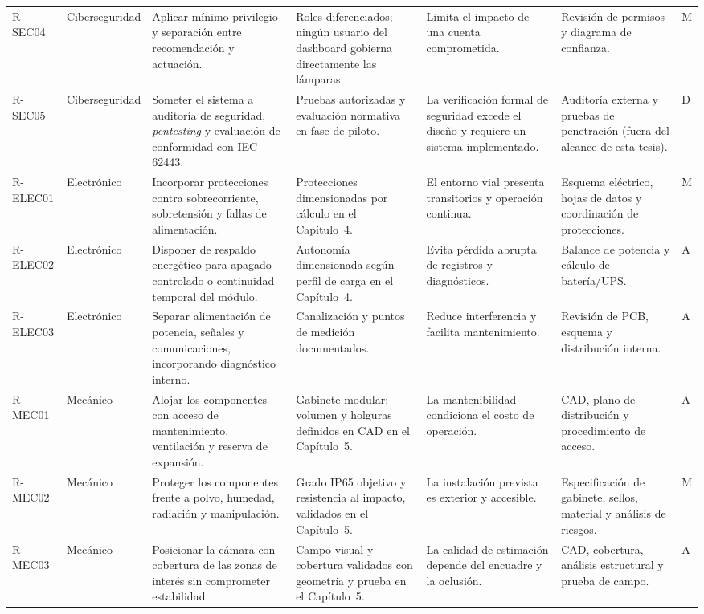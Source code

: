 \begin{landscape}
\begin{longtable}{@{}p{1.15cm}p{1.7cm}p{5.1cm}p{3.1cm}p{4.2cm}p{3.6cm}p{1.0cm}@{}}
R-SEC04 & Ciberseguridad & Aplicar mínimo privilegio y separación entre recomendación y actuación. & Roles diferenciados; ningún usuario del dashboard gobierna directamente las lámparas. & Limita el impacto de una cuenta comprometida. & Revisión de permisos y diagrama de confianza. & M\\
R-SEC05 & Ciberseguridad & Someter el sistema a auditoría de seguridad, \textit{pentesting} y evaluación de conformidad con IEC 62443. & Pruebas autorizadas y evaluación normativa en fase de piloto. & La verificación formal de seguridad excede el diseño y requiere un sistema implementado. & Auditoría externa y pruebas de penetración (fuera del alcance de esta tesis). & D\\
R-ELEC01 & Electrónico & Incorporar protecciones contra sobrecorriente, sobretensión y fallas de alimentación. & Protecciones dimensionadas por cálculo en el Capítulo~4. & El entorno vial presenta transitorios y operación continua. & Esquema eléctrico, hojas de datos y coordinación de protecciones. & M\\
R-ELEC02 & Electrónico & Disponer de respaldo energético para apagado controlado o continuidad temporal del módulo. & Autonomía dimensionada según perfil de carga en el Capítulo~4. & Evita pérdida abrupta de registros y diagnósticos. & Balance de potencia y cálculo de batería/UPS. & A\\
R-ELEC03 & Electrónico & Separar alimentación de potencia, señales y comunicaciones, incorporando diagnóstico interno. & Canalización y puntos de medición documentados. & Reduce interferencia y facilita mantenimiento. & Revisión de PCB, esquema y distribución interna. & A\\
R-MEC01 & Mecánico & Alojar los componentes con acceso de mantenimiento, ventilación y reserva de expansión. & Gabinete modular; volumen y holguras definidos en CAD en el Capítulo~5. & La mantenibilidad condiciona el costo de operación. & CAD, plano de distribución y procedimiento de acceso. & A\\
R-MEC02 & Mecánico & Proteger los componentes frente a polvo, humedad, radiación y manipulación. & Grado IP65 objetivo y resistencia al impacto, validados en el Capítulo~5. & La instalación prevista es exterior y accesible. & Especificación de gabinete, sellos, material y análisis de riesgos. & M\\
R-MEC03 & Mecánico & Posicionar la cámara con cobertura de las zonas de interés sin comprometer estabilidad. & Campo visual y cobertura validados con geometría y prueba en el Capítulo~5. & La calidad de estimación depende del encuadre y la oclusión. & CAD, cobertura, análisis estructural y prueba de campo. & A\\

\end{longtable}
\end{landscape}
